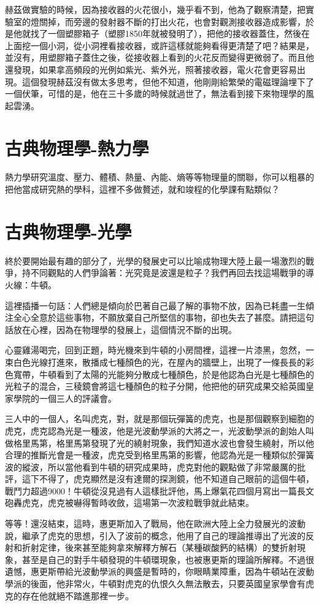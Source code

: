 赫茲做實驗的時候，因為接收器的火花很小，幾乎看不到，他為了觀察清楚，把實驗室的燈關掉，而旁邊的發射器不斷的打出火花，也會對觀測接收器造成影響，於是他就找了一個塑膠箱子（塑膠1850年就被發明了），把他的接收器蓋住，然後在上面挖一個小洞，從小洞裡看接收器，或許這樣就能夠看得更清楚了吧？結果是，並沒有，用塑膠箱子蓋住之後，從接收器上看到的火花反而變得更微弱了。而且他還發現，如果拿高頻段的光例如紫光、紫外光，照著接收器，電火花會更容易出現。這個發現赫茲沒有做太多思考，但他不知道，他剛剛給繁榮的電磁理論埋下了一個伏筆，可惜的是，他在三十多歲的時候就過世了，無法看到接下來物理學的風起雲湧。
	
\section{古典物理學-熱力學}
熱力學研究溫度、壓力、體積、熱量、內能、熵等等物理量的關聯，你可以粗暴的把他當成研究熱的學科，這裡不多做贅述，就和竣程的化學課有點類似？
\section{古典物理學-光學}
終於要開始最有趣的部分了，光學的發展史可以比喻成物理大陸上最一場激烈的戰爭，持不同觀點的人們爭論著：光究竟是波還是粒子？我們再回去找這場戰爭的導火線：牛頓。

這裡插播一句話：人們總是傾向於巴著自己最了解的事物不放，因為已耗盡一生傾注全心全意於這些事物，不願放棄自己所堅信的事物，卻也失去了甚麼。請把這句話放在心裡，因為在物理學的發展上，這個情況不斷的出現。

心靈雞湯喝完，回到正題，時光機來到牛頓的小房間裡，這裡一片漆黑，忽然，一束白色光線打進來，散播成七種顏色的光，在屋內的牆壁上，出現了一條長長的彩色寬帶，牛頓看到了太陽的光能夠分散成七種顏色，於是他認為白光是七種顏色的光粒子的混合，三稜鏡會將這七種顏色的粒子分開，他把他的研究成果交給英國皇家學院的一個三人的評議會。

三人中的一個人，名叫虎克，對，就是那個玩彈簧的虎克，也是那個觀察到細胞的虎克，虎克認為光是一種波，他是光波動學派的大將之一，光波動學派的創始人叫做格里馬第，格里馬第發現了光的繞射現象，我們知道水波也會發生繞射，所以他合理的推斷光會是一種波，虎克受到格里馬第的影響，他認為光是一種類似於彈簧波的縱波，所以當他看到牛頓的研究成果時，虎克對他的觀點做了非常嚴厲的批評，這下不得了，虎克顯然是沒有達爾的探測鏡，他不知道自己眼前的這個牛頓，戰鬥力超過9000！牛頓從沒見過有人這樣批評他，馬上爆氣花四個月寫出一篇長文砲轟虎克，虎克被嚇得暫時收斂，這場第一次波粒戰爭就此結束。

等等！還沒結束，這時，惠更斯加入了戰局，他在歐洲大陸上全力發展光的波動說，繼承了虎克的思想，引入了波前的概念，他用了自己的理論推導出了光波的反射和折射定律，後來甚至能夠拿來解釋方解石（某種碳酸鈣的結構）的雙折射現象，甚至是自己的對手牛頓發現的牛頓環現象，也被惠更斯的理論所解釋。不過很遺憾，惠更斯帶給光波動學派的興盛是暫時的，你眼睛業障重，因為牛頓站在波動學派的後面，他非常火，牛頓對虎克的仇恨久久無法散去，只要英國皇家學會有虎克的存在他就絕不踏進那裡一步。

